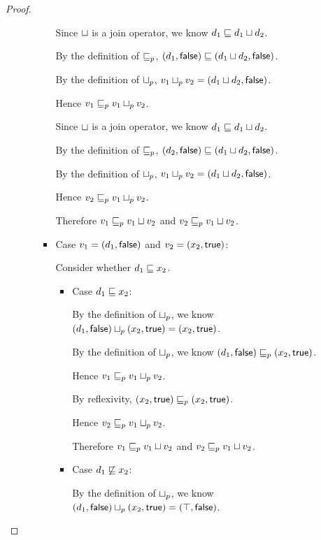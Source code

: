 \begin{proof}
\begin{enumerate}
\begin{enumerate}
\begin{itemize}
        Since $ \sqcup $ is a join operator, we know $d_1 \sqsubseteq
        d_1 \sqcup d_2$.

        By the definition of $\sqsubseteq_p$, $(d_1, \textsf{false})
        \sqsubseteq (d_1 \sqcup d_2, \textsf{false})$.

        By the definition of $ \sqcup_p $, $v_1 \sqcup_p v_2 =
        (d_1 \sqcup d_2, \textsf{false})$.

        Hence $v_1 \sqsubseteq_p v_1 \sqcup_p v_2$.

        Since $ \sqcup $ is a join operator, we know $d_1 \sqsubseteq
        d_1 \sqcup d_2$.

        By the definition of $\sqsubseteq_p$, $(d_2, \textsf{false})
        \sqsubseteq (d_1 \sqcup d_2, \textsf{false})$.

        By the definition of $ \sqcup_p $, $v_1 \sqcup_p v_2 =
        (d_1 \sqcup d_2, \textsf{false})$.

        Hence $v_2 \sqsubseteq_p v_1 \sqcup_p v_2$. 

        Therefore $v_1 \sqsubseteq_p v_1  \sqcup  v_2$ and $v_2 \sqsubseteq_p v_1
         \sqcup  v_2$.
 
      \item Case $v_1 = (d_1, \textsf{false})$ and $v_2 = (x_2, \textsf{true})$:

        Consider whether $d_1 \sqsubseteq x_2$. 
        \begin{itemize}
        \item Case  $d_1 \sqsubseteq x_2$:

          By the definition of $ \sqcup_p $, we know
          $(d_1, \textsf{false})  \sqcup_p 
          (x_2, \textsf{true}) = (x_2, \textsf{true})$.

          By the definition of $ \sqcup_p $, we know
          $(d_1, \textsf{false}) \sqsubseteq_p (x_2, \textsf{true})$.

          Hence $v_1 \sqsubseteq_p v_1 \sqcup_p v_2$.

          By reflexivity, $(x_2, \textsf{true}) \sqsubseteq_p
          (x_2, \textsf{true})$.

          Hence $v_2 \sqsubseteq_p v_1 \sqcup_p v_2$.

          Therefore $v_1 \sqsubseteq_p v_1  \sqcup  v_2$ and $v_2 \sqsubseteq_p
          v_1  \sqcup  v_2$.

        \item Case $d_1 \not\sqsubseteq x_2$:

          By the definition of $ \sqcup_p $, we know
          $(d_1, \textsf{false})  \sqcup_p 
          (x_2, \textsf{true}) = (\top, \textsf{false})$.


\end{itemize}
\end{itemize}
\end{enumerate}
\end{enumerate}
\end{proof}
